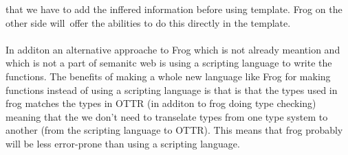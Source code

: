 that we have to add the inffered information before using template. Frog on the other side will offer the abilities to 
do this directly in the template. 
\\ \\
In additon an alternative approache to Frog which is not already meantion and which is not a part of semanitc web 
is using a scripting language to write the functions.
The benefits of making a whole new language like Frog for making functions instead of using a scripting language is 
that is that the types used in frog matches the types in OTTR (in additon to frog doing type checking) meaning that 
the we don't need to transelate types from one type system to another (from the scripting language to OTTR). This means 
that frog probably will be less error-prone than using a scripting language.
